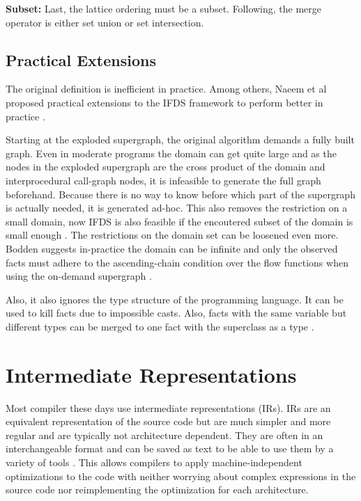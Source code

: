 \documentclass[../draft.tex]{subfiles}
\begin{document}
    \textbf{Subset:} Last, the lattice ordering must be a subset. Following, the merge operator is either set union or set intersection.
  
    \subsection{Practical Extensions}
    The original definition is inefficient in practice. Among others, Naeem et al proposed practical extensions to the IFDS framework to perform better in practice \cite{Naeem2010}.

    Starting at the exploded supergraph, the original algorithm demands a fully built graph. Even in moderate programs the domain can get quite large and as the nodes in the exploded supergraph are the cross product of the domain and interprocedural call-graph nodes, it is infeasible to generate the full graph beforehand. Because there is no way to know before which part of the supergraph is actually needed, it is generated ad-hoc. This also removes the restriction on a small domain, now IFDS is also feasible if the encoutered subset of the domain is small enough \cite{Naeem2010}.
    The restrictions on the domain set can be loosened even more. Bodden suggests in-practice the domain can be infinite and only the observed facts must adhere to the ascending-chain condition over the flow functions when using the on-demand supergraph \cite{Bodden2012}.
    
    Also, it also ignores the type structure of the programming language. It can be used to kill facts due to impossible casts. Also, facts with the same variable but different types can be merged to one fact with the superclass as a type \cite{Naeem2010}.


    \section{Intermediate Representations}\label{s:jimple}
    Most compiler these days use intermediate representations (IRs). IRs are an equivalent representation of the source code but are much simpler and more regular and are typically not architecture dependent. They are often in an interchangeable format and can be saved as text to be able to use them by a variety of tools \cite{Thain2019}.
    This allows compilers to apply machine-independent optimizations to the code with neither worrying about complex expressions in the source code nor reimplementing the optimization for each architecture. 
\end{document}
